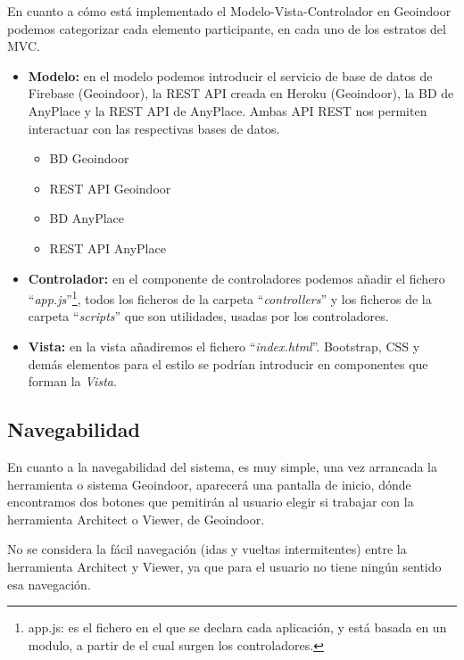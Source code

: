 En cuanto a cómo está implementado el Modelo-Vista-Controlador en Geoindoor podemos categorizar cada elemento participante, en cada uno de los estratos del MVC.

\begin{itemize}
	\item \textbf{Modelo:} en el modelo podemos introducir el servicio de base de datos de Firebase (Geoindoor), la REST API creada en Heroku (Geoindoor), la BD de AnyPlace y la REST API de AnyPlace. Ambas API REST nos permiten interactuar con las respectivas bases de datos.
	\begin{itemize}
		\item BD Geoindoor
		\item REST API Geoindoor 
		\item BD AnyPlace
		\item REST API AnyPlace 
	\end{itemize}
	\item \textbf{Controlador:} en el componente de controladores podemos añadir el fichero ``\textit{app.js}''\footnote{app.js: es el fichero en el que se declara cada aplicación, y está basada en un modulo, a partir de el cual surgen los controladores.}, todos los ficheros de la carpeta ``\textit{controllers}'' y los ficheros de la carpeta  ``\textit{scripts}'' que son utilidades, usadas por los controladores.
	\item \textbf{Vista:} en la vista añadiremos el fichero ``\textit{index.html}''. Bootstrap, CSS y demás elementos para el estilo se podrían introducir en componentes que forman la \textit{Vista}.
\end{itemize}



\subsection{Navegabilidad}

En cuanto a la navegabilidad del sistema, es muy simple, una vez arrancada la herramienta o sistema Geoindoor, aparecerá una pantalla de inicio, dónde encontramos dos botones que pemitirán al usuario elegir si trabajar con la herramienta Architect o Viewer, de Geoindoor. 


No se considera la fácil navegación (idas y vueltas intermitentes) entre la herramienta Architect y Viewer, ya que para el usuario no tiene ningún sentido esa navegación. 